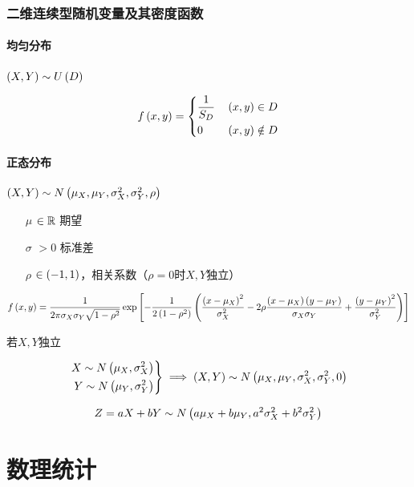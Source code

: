 \documentclass{article}
\begin{document}
\section{二维连续型随机变量及其密度函数}

\subsection{均匀分布}

$\left(X,Y\right)\sim U\left(D\right)$

\[f\left(x,y\right)=\left\{\begin{aligned}
         & \frac1{S_D} &  & \left(x,y\right)\in D    \\
         & 0           &  & \left(x,y\right)\notin D \\
    \end{aligned}\right.\]

\subsection{正态分布}

$\left(X,Y\right)\sim N\left(\mu_X,\mu_Y,\sigma_X^2,\sigma_Y^2,\rho\right)$

\begin{enumerate}
    \item [$\mu$] $\in\mathbb R$ 期望
    \item [$\sigma$] $>0$ 标准差
    \item [$\rho$] $\in\left(-1,1\right)$，相关系数（$\rho=0$时$X,Y$独立）
\end{enumerate}

\[f\left(x,y\right)=\frac1{2\pi\sigma_X\sigma_Y\sqrt{1-\rho^2}}
    \exp\left[-\frac1{2\left(1-\rho^2\right)}
        \left(\frac{{\left(x-\mu_X\right)}^2}{\sigma_X^2}
            -2\rho\frac{\left(x-\mu_X\right)\left(y-\mu_Y\right)}{\sigma_X\sigma_Y}
            +\frac{{\left(y-\mu_Y\right)}^2}{\sigma_Y^2}\right)\right]\]

若$X,Y$独立

\[\left.\begin{aligned}
        X\sim N\left(\mu_X,\sigma_X^2\right) \\
        Y\sim N\left(\mu_Y,\sigma_Y^2\right)
    \end{aligned}\right\}\implies
    \left(X,Y\right)\sim N\left(\mu_X,\mu_Y,\sigma_X^2,\sigma_Y^2,0\right)\]


\[Z=aX+bY\sim N\left(a\mu_X+b\mu_Y,a^2\sigma_X^2+b^2\sigma_Y^2\right)\]

\part{数理统计}
\end{document}

